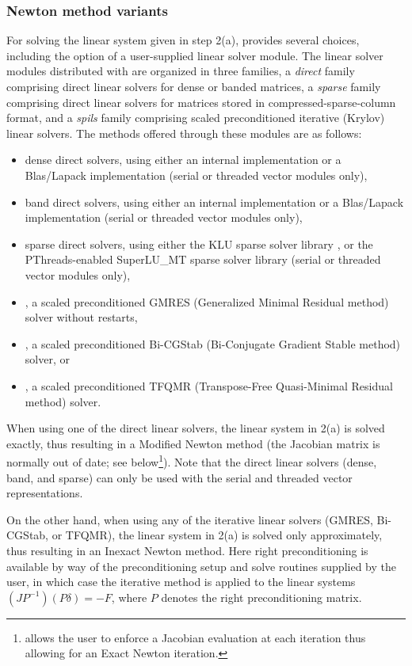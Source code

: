 
\subsubsection*{Newton method variants}
For solving the linear system given in step 2(a), {\kinsol} provides
several choices, including the option of a user-supplied
linear solver module. The linear solver modules distributed with {\sundials}
are organized in three families, a {\em direct} family comprising direct linear 
solvers for dense or banded matrices, a {\em sparse} family comprising
direct linear solvers for matrices stored in compressed-sparse-column
format, and a {\em spils} family comprising scaled preconditioned
iterative (Krylov) linear solvers. 
The methods offered through these modules are as follows:
\begin{itemize}
\item dense direct solvers, using either an internal implementation or 
  a Blas/Lapack implementation (serial or threaded vector modules only),
\item band direct solvers, using either an internal implementation or 
  a Blas/Lapack implementation (serial or threaded vector modules only),
\item sparse direct solvers, using either the KLU sparse solver
  library \cite{KLU_site}, or the PThreads-enabled SuperLU\_MT sparse
  solver library \cite{SuperLUMT_site} (serial or threaded vector modules only),
\item {\spgmr}, a scaled preconditioned GMRES (Generalized Minimal Residual method)
  solver without restarts,
\item {\spbcg}, a scaled preconditioned Bi-CGStab (Bi-Conjugate Gradient Stable
  method) solver, or
\item {\sptfqmr}, a scaled preconditioned TFQMR (Transpose-Free Quasi-Minimal
  Residual method) solver.
\end{itemize}
When using one of the direct linear solvers, the linear system in 2(a) is 
solved exactly, thus resulting in a Modified Newton method (the Jacobian matrix 
is normally out of date; see below\footnote{{\kinsol} allows the user to enforce 
a Jacobian evaluation at each iteration thus allowing for an Exact Newton iteration.}). 
Note that the direct linear solvers (dense, band, and sparse) can only
be used with the serial and threaded vector representations.

On the other hand, when using any of the iterative linear solvers
(GMRES, Bi-CGStab, or TFQMR), the linear system in 2(a) is solved only
approximately, thus resulting in an Inexact Newton method.  Here right
preconditioning is available by way of the preconditioning setup and
solve routines supplied by the user, in which case the iterative
method is applied to the linear systems $(JP^{-1})(P\delta) = -F$,
where $P$ denotes the right preconditioning matrix.

